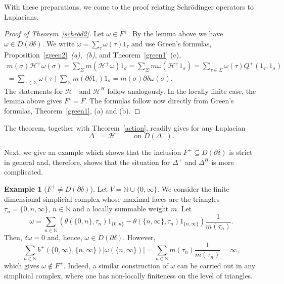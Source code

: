 \documentclass[10pt]{amsart}
\theoremstyle{definition}
\newtheorem{example}[theorem]{Example}
\newcommand{\F}{{F}}
\begin{document}
With these preparations, we come to the proof relating Schrödinger operators to Laplacians.

\begin{proof}[Proof of Theorem~\ref{schröd2}] Let $\omega\in \F^{+}$. By the lemma above we have $\omega\in D(\partial\delta)$. We write $\omega=\sum_{\tau}\omega(\tau)1_{\tau}$ and use Green's formulas, Proposition~\ref{green2}~\emph{(a)},~\emph{(b)}, and Theorem~\ref{green1} (c),
	\begin{multline*}
		m(\sigma)\mathcal{H}^{+}\omega (\sigma)= \sum_{\Sigma}m(\mathcal{H}^+\omega )1_\sigma = \sum_\Sigma m\omega(\mathcal{H}^+ 1_\sigma) =\sum_{\tau\in\Sigma}\omega(\tau)Q^{+}(1_{\tau},1_{\sigma})\\=\sum_{\tau\in\Sigma}\omega(\tau)\sum_{\Sigma}m(\partial\delta 1_{\tau})1_{\sigma}=m(\sigma)\partial\delta \omega(\sigma).
	\end{multline*}
The statements for $\mathcal{H}^{-}$ and $\mathcal{H}^{H}$ follow analogously. In the locally finite case, the lemma above gives $\F^{\circ}=\F$.
The formulas follow now directly from Green's formulas, Theorem~\ref{green1}, (a) and (b).
\end{proof}

The theorem, together with Theorem~\ref{action}, readily gives for any Laplacian $$\Delta^{-}=\mathcal{H}^- \qquad \mbox{on }D(\Delta^{-}).$$

Next, we give an example which shows that the inclusion $F^{+}\subseteq D(\partial\delta)$ is strict in general and, therefore, shows that the situation for $\Delta^{+}$ and $\Delta^{H}$
is more complicated.


\begin{example}[$\F^{+}\neq D(\partial\delta)$]
	Let $V=\mathbb{N}\cup\{0,\infty\}$. We consider the finite dimensional simplicial complex whose maximal faces are the triangles $\tau_{n}=\{0,n,\infty\}$, $n\in \mathbb{N}$ and a locally summable weight $m$.
	Let
	\begin{equation*}
		\omega=\sum_{n\in \mathbb{N}}\left(\theta(\{0,n\},\tau_{n}) 1_{\{0,n\}} - \theta (\{n,\infty\},\tau_{n}) 1_{\{n,\infty\}}\right)\frac{1}{m(\tau_{n})}.
	\end{equation*}
	Then, $\delta\omega=0$ and, hence, $\omega\in D(\partial\delta)$. However, 
	\begin{equation*}
		\sum_{n\in \mathbb{N}}b^{+}(\{0,\infty\}, \{n,\infty\})|\omega(\{n,\infty\})|=\sum_{n\in \mathbb{N}}m(\tau_{n})\frac{1}{m(\tau_{n})}=\infty,
	\end{equation*}
	which gives $\omega\not\in \F^{+}$. Indeed, a similar construction of $\omega$ can be carried out in any simplicial complex, where one has  non-locally finiteness on the level of triangles.
\end{example}
\end{document}
